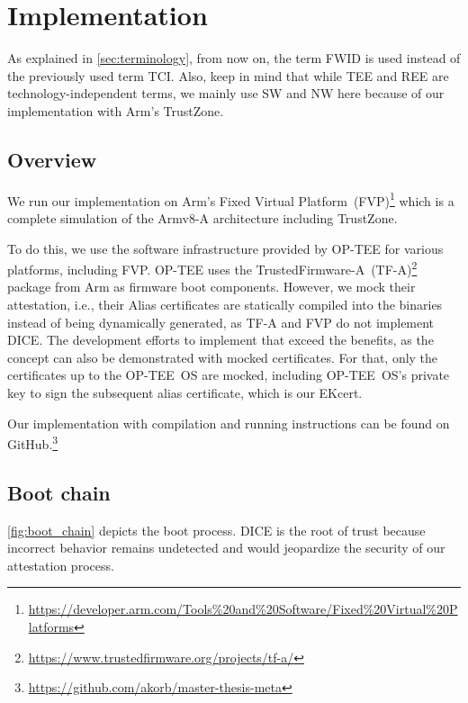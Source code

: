 
\chapter{Implementation}\label{chapter:implementation}

As explained in \autoref{sec:terminology}, from now on, the term \acf{FWID} is used instead of the previously used term \acf{TCI}.
Also, keep in mind that while \ac{TEE} and \ac{REE} are technology-independent terms, we mainly use \acf{SW} and \acf{NW} here because of our implementation with Arm's TrustZone.

\section{Overview}

We run our implementation on Arm's Fixed Virtual Platform~(FVP)\footnote{\url{https://developer.arm.com/Tools\%20and\%20Software/Fixed\%20Virtual\%20Platforms}} which is a complete simulation of the Armv8-A architecture including TrustZone.

To do this, we use the software infrastructure provided by OP-TEE for various platforms, including FVP\@.
OP-TEE uses the TrustedFirmware-A~(TF-A)\footnote{\url{https://www.trustedfirmware.org/projects/tf-a/}} package from Arm as firmware boot components.
However, we mock their attestation, i.e., their Alias certificates are statically compiled into the binaries instead of being dynamically generated, as TF-A and FVP do not implement DICE\@.
The development efforts to implement that exceed the benefits, as the concept can also be demonstrated with mocked certificates.
For that, only the certificates up to the OP-TEE~OS are mocked, including OP-TEE~OS's private key to sign the subsequent alias certificate, which is our EKcert.

Our implementation with compilation and running instructions can be found on GitHub.\footnote{\url{https://github.com/akorb/master-thesis-meta}}

\section{Boot chain}

\autoref{fig:boot_chain} depicts the boot process.
DICE is the root of trust because incorrect behavior remains undetected and would jeopardize the security of our attestation process.

